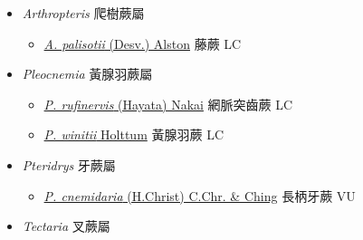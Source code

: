 
  \begin{itemize}
 \item[] \textit{Arthropteris} 爬樹蕨屬
                    
  \begin{itemize}
        \item[] \href{http://www.theplantlist.org/tpl1.1/search?q=Arthropteris+palisotii}{\textit{A. palisotii} (Desv.) Alston}   藤蕨 LC
  \end{itemize}
 \item[] \textit{Pleocnemia} 黃腺羽蕨屬
                    
  \begin{itemize}
        \item[] \href{http://www.theplantlist.org/tpl1.1/search?q=Pleocnemia+rufinervis}{\textit{P. rufinervis} (Hayata) Nakai}   網脈突齒蕨 LC
        \item[] \href{http://www.theplantlist.org/tpl1.1/search?q=Pleocnemia+winitii}{\textit{P. winitii} Holttum}     黃腺羽蕨 LC
  \end{itemize}
 \item[] \textit{Pteridrys} 牙蕨屬
                    
  \begin{itemize}
        \item[] \href{http://www.theplantlist.org/tpl1.1/search?q=Pteridrys+cnemidaria}{\textit{P. cnemidaria} (H.Christ) C.Chr. \& Ching}   長柄牙蕨 VU
  \end{itemize}
 \item[] \textit{Tectaria} 叉蕨屬
                    

\end{itemize}
